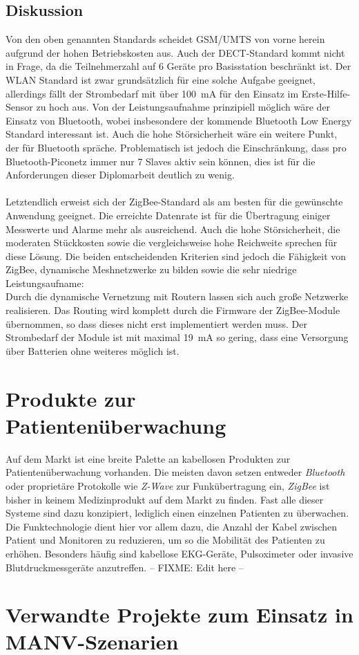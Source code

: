     \subsection{Diskussion}
        Von den oben genannten Standards scheidet GSM/UMTS von vorne herein aufgrund der hohen Betriebskosten aus.
        Auch der DECT-Standard kommt nicht in Frage, da die Teilnehmerzahl auf 6 Geräte pro Basisstation beschränkt ist.
        Der WLAN Standard ist zwar grundsätzlich für eine solche Aufgabe geeignet, allerdings fällt der Strombedarf mit
        über 100~mA für den Einsatz im Erste-Hilfe-Sensor zu hoch aus. Von der Leistungsaufnahme prinzipiell möglich wäre
        der Einsatz von Bluetooth, wobei insbesondere der kommende Bluetooth Low Energy Standard interessant ist. Auch die
        hohe Störsicherheit wäre ein weitere Punkt, der für Bluetooth spräche. Problematisch ist jedoch die Einschränkung,
        dass pro Bluetooth-Piconetz immer nur 7 Slaves aktiv sein können, dies ist für die Anforderungen dieser Diplomarbeit
        deutlich zu wenig.\\
        \\
        Letztendlich erweist sich der ZigBee-Standard als am besten für die gewünschte Anwendung geeignet. Die erreichte
        Datenrate ist für die Übertragung einiger Messwerte und Alarme mehr als ausreichend. Auch die hohe Störsicherheit,
        die moderaten Stückkosten sowie die vergleichsweise hohe Reichweite sprechen für diese Lösung. 
        Die beiden entscheidenden Kriterien sind jedoch die Fähigkeit von ZigBee, dynamische Meshnetzwerke zu bilden sowie
        die sehr niedrige Leistungsaufname:\\
        Durch die dynamische Vernetzung mit Routern lassen sich auch große Netzwerke realisieren. Das Routing wird komplett
        durch die Firmware der ZigBee-Module übernommen, so dass dieses nicht erst implementiert werden muss. Der Strombedarf
        der Module ist mit maximal 19~mA so gering, dass eine Versorgung über Batterien ohne weiteres möglich ist.

\section{Produkte zur Patientenüberwachung}\label{produkte_zur_patientenueberwachung}
Auf dem Markt ist eine breite Palette an kabellosen Produkten zur Patientenüberwachung vorhanden. Die meisten davon setzen
entweder \emph{Bluetooth} oder proprietäre Protokolle wie \emph{Z-Wave} zur Funkübertragung ein, \emph{ZigBee} ist bisher in
keinem Medizinprodukt auf dem Markt zu finden. Fast alle dieser Systeme sind dazu konzipiert, lediglich einen einzelnen 
Patienten zu überwachen. Die Funktechnologie dient hier vor allem dazu, die Anzahl der Kabel zwischen Patient und Monitoren 
zu reduzieren, um so die Mobilität des Patienten zu erhöhen. Besonders häufig sind kabellose EKG-Geräte, Pulsoximeter oder 
invasive Blutdruckmessgeräte anzutreffen. 
-- FIXME: Edit here --

\section{Verwandte Projekte zum Einsatz in MANV-Szenarien}\label{verwandte_projekte}
